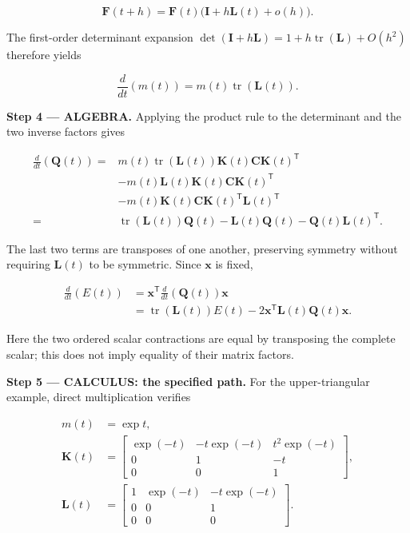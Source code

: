 \documentclass[11pt,oneside,openany]{book}
\begin{document}
\[
\mathbf F(t+h)=\mathbf F(t)\bigl(\mathbf I+h\mathbf L(t)+o(h)\bigr).
\]

The first-order determinant expansion \(\det(\mathbf I+h\mathbf L)=1+h\operatorname{tr}(\mathbf L)+O(h^2)\) therefore yields

\[
\frac{d}{dt}\left(m(t)\right)=m(t)\operatorname{tr}(\mathbf L(t)).
\]

\begingroup\color{AlgebraBlue}
\textbf{Step 4 --- ALGEBRA.} Applying the product rule to the determinant and the two inverse factors gives

\[
\begin{aligned}
\frac{d}{dt}\left(\mathbf Q(t)\right)
={}&m(t)\operatorname{tr}(\mathbf L(t))\mathbf K(t)\mathbf C\mathbf K(t)^{\mathsf T}\\
&-m(t)\mathbf L(t)\mathbf K(t)\mathbf C\mathbf K(t)^{\mathsf T}\\
&-m(t)\mathbf K(t)\mathbf C\mathbf K(t)^{\mathsf T}\mathbf L(t)^{\mathsf T}\\
={}&\operatorname{tr}(\mathbf L(t))\mathbf Q(t)
-\mathbf L(t)\mathbf Q(t)-\mathbf Q(t)\mathbf L(t)^{\mathsf T}.
\end{aligned}
\]

The last two terms are transposes of one another, preserving symmetry without requiring \(\mathbf L(t)\) to be symmetric. Since \(\mathbf x\) is fixed,

\[
\begin{aligned}
\frac{d}{dt}\left(E(t)\right)
&=\mathbf x^{\mathsf T}\frac{d}{dt}\left(\mathbf Q(t)\right)\mathbf x\\
&=\operatorname{tr}(\mathbf L(t))E(t)
-2\mathbf x^{\mathsf T}\mathbf L(t)\mathbf Q(t)\mathbf x.
\end{aligned}
\]

Here the two ordered scalar contractions are equal by transposing the complete scalar; this does not imply equality of their matrix factors.

\endgroup
\textbf{Step 5 --- CALCULUS: the specified path.} For the upper-triangular example, direct multiplication verifies

\[
\begin{aligned}
m(t)&=\exp t,\\
\mathbf K(t)&=\begin{bmatrix}\exp(-t)&-t\exp(-t)&t^2\exp(-t)\\0&1&-t\\0&0&1\end{bmatrix},\\
\mathbf L(t)&=\begin{bmatrix}1&\exp(-t)&-t\exp(-t)\\0&0&1\\0&0&0\end{bmatrix}.
\end{aligned}
\]
\end{document}
